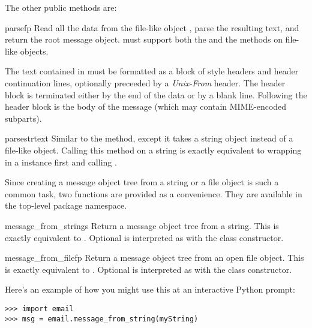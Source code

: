 The other public  methods are:

\begin{methoddesc}[Parser]{parse}{fp}
Read all the data from the file-like object , parse the
resulting text, and return the root message object.   must
support both the  and the  methods
on file-like objects.

The text contained in  must be formatted as a block of 
style headers and header continuation lines, optionally preceeded by a
\emph{Unix-From} header.  The header block is terminated either by the
end of the data or by a blank line.  Following the header block is the
body of the message (which may contain MIME-encoded subparts).
\end{methoddesc}

\begin{methoddesc}[Parser]{parsestr}{text}
Similar to the  method, except it takes a string
object instead of a file-like object.  Calling this method on a string
is exactly equivalent to wrapping  in a 
instance first and calling .
\end{methoddesc}

Since creating a message object tree from a string or a file object is
such a common task, two functions are provided as a convenience.  They
are available in the top-level  package namespace.

\begin{funcdesc}{message_from_string}{s}
Return a message object tree from a string.  This is exactly
equivalent to .  Optional  is
interpreted as with the  class constructor.
\end{funcdesc}

\begin{funcdesc}{message_from_file}{fp}
Return a message object tree from an open file object.  This is exactly
equivalent to .  Optional  is
interpreted as with the  class constructor.
\end{funcdesc}

Here's an example of how you might use this at an interactive Python
prompt:

\begin{verbatim}
>>> import email
>>> msg = email.message_from_string(myString)
\end{verbatim}

